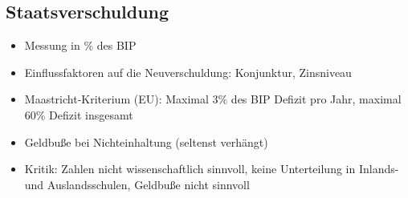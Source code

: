 \documentclass[titlepage,parskip=half]{scrartcl}
\begin{document}
\subsection{Staatsverschuldung}
\begin{itemize}
    \item Messung in \% des BIP
    \item Einflussfaktoren auf die Neuverschuldung: Konjunktur, Zinsniveau
    \item Maastricht-Kriterium (EU): Maximal 3\% des BIP Defizit pro Jahr, maximal 60\% Defizit insgesamt
    \item Geldbuße bei Nichteinhaltung (seltenst verhängt)
    \item Kritik: Zahlen nicht wissenschaftlich sinnvoll, keine Unterteilung in Inlands- und Auslandsschulen, Geldbuße nicht sinnvoll
\end{itemize}
\end{document}
